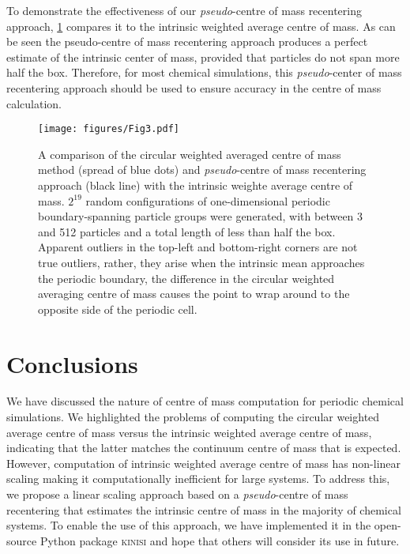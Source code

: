 \documentclass[reprint,superscriptaddress,nobibnotes,amsmath,amssymb,aip]{revtex4-2}
\begin{document}
To demonstrate the effectiveness of our \emph{pseudo}-centre of mass recentering approach, \cref{fig:method_valid} compares it to the intrinsic weighted average centre of mass. 
As can be seen the pseudo-centre of mass recentering approach produces a perfect estimate of the intrinsic center of mass, provided that particles do not span more half the box. 
Therefore, for most chemical simulations, this \emph{pseudo}-center of mass recentering approach should be used to ensure accuracy in the centre of mass calculation. 
%
\begin{figure}
    \centering
    \texttt{[image: figures/Fig3.pdf]}
    \caption{A comparison of the circular weighted averaged centre of mass method (spread of blue dots) and \emph{pseudo}-centre of mass recentering approach (black line) with the intrinsic weighte average centre of mass. 
    $2^{19}$ random configurations of one-dimensional periodic boundary-spanning particle groups were generated, with between 3 and 512 particles and a total length of less than half the box. 
    Apparent outliers in the top-left and bottom-right corners are not true outliers, rather, they arise when the intrinsic mean approaches the periodic boundary, the difference in the circular weighted averaging centre of mass causes the point to wrap around to the opposite side of the periodic cell.
    }
    \label{fig:method_valid}
\end{figure}
%

\section{Conclusions}

We have discussed the nature of centre of mass computation for periodic chemical simulations.
We highlighted the problems of computing the circular weighted average centre of mass versus the intrinsic weighted average centre of mass, indicating that the latter matches the continuum centre of mass that is expected. 
However, computation of intrinsic weighted average centre of mass has non-linear scaling making it computationally inefficient for large systems. 
To address this, we propose a linear scaling approach based on a \emph{pseudo}-centre of mass recentering that estimates the intrinsic centre of mass in the majority of chemical systems. 
To enable the use of this approach, we have implemented it in the open-source Python package \textsc{kinisi}\cite{mccluskey_kinisi_2024} and hope that others will consider its use in future. 
\end{document}

